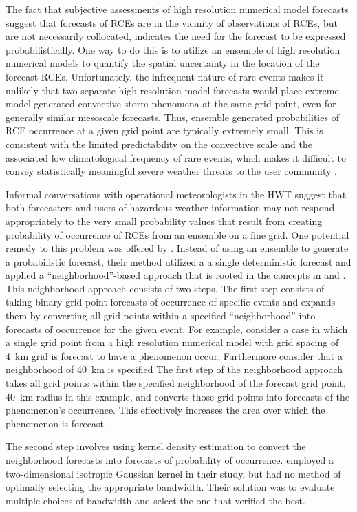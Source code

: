 The fact that subjective assessments of high resolution numerical model forecasts suggest that forecasts of RCEs are in the vicinity of observations of RCEs, but are not necessarily collocated, indicates the need for the forecast to be expressed probabilistically.
One way to do this is to utilize an ensemble of high resolution numerical models to quantify the spatial uncertainty in the location of the forecast RCEs.
Unfortunately, the infrequent nature of rare events makes it unlikely that two separate high-resolution model forecasts would place extreme model-generated convective storm phenomena at the same grid point, even for generally similar mesoscale forecasts.
Thus, ensemble generated probabilities of RCE occurrence at a given grid point are typically extremely small.
This is consistent with the limited predictability on the convective scale and the associated low climatological frequency of rare events, which makes it difficult to convey statistically meaningful severe weather threats to the user community \citep{Murphy1991}.


Informal conversations with operational meteorologists in the HWT suggest that both forecasters and users of hazardous weather information may not respond appropriately to the very small probability values that result from creating probability of occurrence of RCEs from an ensemble on a fine grid.
One potential remedy to this problem was offered by \cite{Sobash2011}.
Instead of using an ensemble to generate a probabilistic forecast, their method utilized a a single deterministic forecast and applied a ``neighborhood''-based approach that is rooted in the concepts in \cite{Theis2005} and \cite{Brooks1998}.
This neighborhood approach consists of two steps.
The first step consists of taking binary grid point forecasts of occurrence of specific events and expands them by converting all grid points within a specified ``neighborhood'' into forecasts of occurrence for the given event.
For example, consider a case in which a single grid point from a high resolution numerical model with grid spacing of \mbox{4 km} grid is forecast to have a phenomenon occur.
Furthermore consider that a neighborhood of \mbox{40 km} is specified
The first step of the neighborhood approach takes all grid points within the specified neighborhood of the forecast grid point, \mbox{40 km} radius in this example, and converts those grid points into forecasts of the phenomenon's occurrence.
This effectively increases the area over which the phenomenon is forecast.


The second step involves using kernel density estimation to convert the neighborhood forecasts into forecasts of probability of occurrence.
\cite{Sobash2011} employed a two-dimensional isotropic Gaussian kernel in their study, but had no method of optimally selecting the appropriate bandwidth.
Their solution was to evaluate multiple choices of bandwidth and select the one that verified the best.


